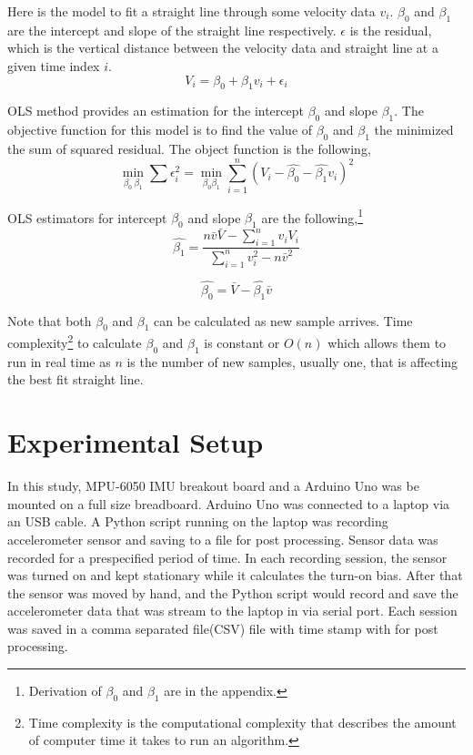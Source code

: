 \documentclass{article}
\begin{document}
Here is the model to fit a straight line through some velocity data $v_i$. $\beta_0$ and $\beta_1$ are the intercept and slope of the straight line respectively. $\epsilon$ is the residual, which is the vertical distance between the velocity data and straight line at a given time index $i$.
$$V_i = \beta_0 + \beta_1 v_i + \epsilon_i$$

OLS method provides an estimation for the intercept $\beta_0$ and slope $\beta_1$. The objective function for this model is to find the value of $\beta_0$ and $\beta_1$ the minimized the sum of squared residual. The object function is the following,
\begin{equation}
\min_{\beta_0\ \beta_1} \sum \epsilon_i^2 = \min_{\beta_0\beta_1}  \sum_{i=1}^{n}(V_i - \hat{\beta_0} - \hat{\beta_1}v_i)^2 \nonumber
\end{equation}

OLS estimators for intercept $\beta_0$ and slope $\beta_1$ are the following,\footnote{Derivation of $\beta_0$ and $\beta_1$ are in the appendix.}
$$\hat{\beta_1} = \frac{n\bar{v}\bar{V} - \sum_{i=1}^{n} v_iV_i}{\sum_{i=1}^{n} v_i^2 - n\bar{v}^2}$$

$$\hat{\beta_0} =  \bar{V} - \hat{\beta_1}\bar{v}$$

Note that both $\beta_0$ and $\beta_1$ can be calculated as new sample arrives. Time complexity\footnote{Time complexity is the computational complexity that describes the amount of computer time it takes to run an algorithm.} to calculate $\beta_0$ and $\beta_1$ is constant or $O(n)$ which allows them to run in real time as $n$ is the number of new samples, usually one, that is affecting the best fit straight line.

\section{Experimental Setup}
In this study, MPU-6050 IMU breakout board and a Arduino Uno was be mounted on a full size breadboard. Arduino Uno was connected to a laptop via an USB cable. A Python script running on the laptop was recording accelerometer sensor and saving to a file for post processing. Sensor data was recorded for a prespecified period of time. In each recording session, the sensor was turned on and kept stationary while it calculates the turn-on bias. After that the sensor was moved by hand, and the Python script would record and save the accelerometer data that was stream to the laptop in via serial port. Each session was saved in a comma separated file(CSV) file with time stamp with for post processing.
\end{document}
